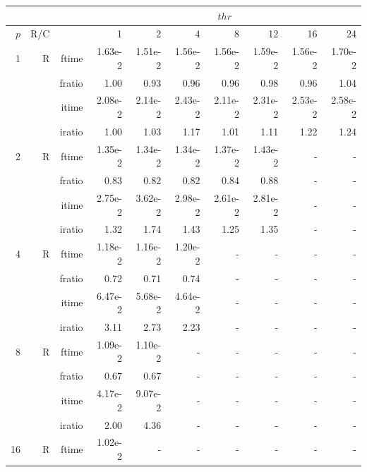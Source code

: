 \documentclass[a4paper]{article}
\begin{document}
\begin{table}[htbp]
\begin{center}
\begin{small}
\begin{tabular}{|r|r|r|r|r|r|r|r|r|r|}
\hline 
     & & & \multicolumn{7}{c|}{$thr$} \\ \hline
    $p$ & R/C &  & 1           & 2    & 4    & 8    & 12   & 16    & 24  \\ \hline\hline
   1 &  R &  ftime &   1.63e-2 &   1.51e-2 &   1.56e-2 &   1.56e-2 &   1.59e-2 &   1.56e-2 &   1.70e-2 \\
           &          & fratio &   1.00 &   0.93 &   0.96 &   0.96 &   0.98 &   0.96 &   1.04 \\
           &          & itime &   2.08e-2 &   2.14e-2 &   2.43e-2 &   2.11e-2 &   2.31e-2 &   2.53e-2 &   2.58e-2 \\
           &          & iratio &   1.00 &   1.03 &   1.17 &   1.01 &   1.11 &   1.22 &   1.24 \\\hline
   2 &  R &  ftime &   1.35e-2 &   1.34e-2 &   1.34e-2 &   1.37e-2 &   1.43e-2 &  - &  - \\
           &          & fratio &   0.83 &   0.82 &   0.82 &   0.84 &   0.88 &  - &  - \\
           &          & itime &   2.75e-2 &   3.62e-2 &   2.98e-2 &   2.61e-2 &   2.81e-2 &  - &  - \\
           &          & iratio &   1.32 &   1.74 &   1.43 &   1.25 &   1.35 &  - &  - \\\hline
   4 &  R &  ftime &   1.18e-2 &   1.16e-2 &   1.20e-2 &  - &  - &  - &  - \\
           &          & fratio &   0.72 &   0.71 &   0.74 &  - &  - &  - &  - \\
           &          & itime &   6.47e-2 &   5.68e-2 &   4.64e-2 &  - &  - &  - &  - \\
           &          & iratio &   3.11 &   2.73 &   2.23 &  - &  - &  - &  - \\\hline
   8 &  R &  ftime &   1.09e-2 &   1.10e-2 &  - &  - &  - &  - &  - \\
           &          & fratio &   0.67 &   0.67 &  - &  - &  - &  - &  - \\
           &          & itime &   4.17e-2 &   9.07e-2 &  - &  - &  - &  - &  - \\
           &          & iratio &   2.00 &   4.36 &  - &  - &  - &  - &  - \\\hline
   16 & R &  ftime &   1.02e-2 &  - &  - &  - &  - &  - &  - \\

\end{tabular}
\end{small}
\end{center}
\end{table}
\end{document}
